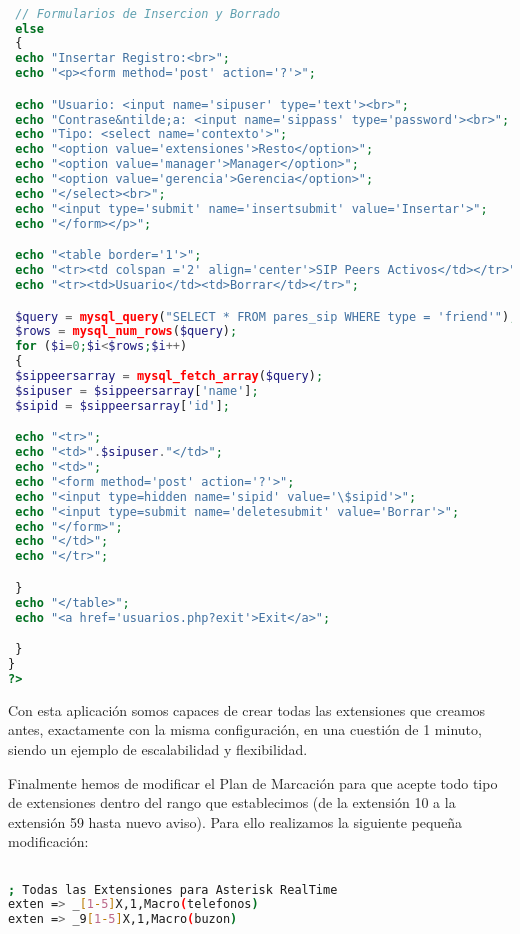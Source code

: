 \begin{lstlisting}[language=php,title={./www/usuarios.php}]

 // Formularios de Insercion y Borrado
 else
 {
 echo "Insertar Registro:<br>";
 echo "<p><form method='post' action='?'>";

 echo "Usuario: <input name='sipuser' type='text'><br>";
 echo "Contrase&ntilde;a: <input name='sippass' type='password'><br>";
 echo "Tipo: <select name='contexto'>";
 echo "<option value='extensiones'>Resto</option>";
 echo "<option value='manager'>Manager</option>";
 echo "<option value='gerencia'>Gerencia</option>";
 echo "</select><br>";
 echo "<input type='submit' name='insertsubmit' value='Insertar'>";
 echo "</form></p>";

 echo "<table border='1'>";
 echo "<tr><td colspan ='2' align='center'>SIP Peers Activos</td></tr>";
 echo "<tr><td>Usuario</td><td>Borrar</td></tr>";

 $query = mysql_query("SELECT * FROM pares_sip WHERE type = 'friend'");
 $rows = mysql_num_rows($query);
 for ($i=0;$i<$rows;$i++)
 {
 $sippeersarray = mysql_fetch_array($query);
 $sipuser = $sippeersarray['name'];
 $sipid = $sippeersarray['id'];

 echo "<tr>";
 echo "<td>".$sipuser."</td>";
 echo "<td>";
 echo "<form method='post' action='?'>";
 echo "<input type=hidden name='sipid' value='\$sipid'>";
 echo "<input type=submit name='deletesubmit' value='Borrar'>";
 echo "</form>";
 echo "</td>";
 echo "</tr>";

 }
 echo "</table>";
 echo "<a href='usuarios.php?exit'>Exit</a>";

 }
}
?>

\end{lstlisting}

Con esta aplicación somos capaces de crear todas las extensiones que creamos antes, exactamente con la misma configuración, en una cuestión de 1 minuto, siendo un ejemplo de escalabilidad y flexibilidad.

Finalmente hemos de modificar el Plan de Marcación para que acepte todo tipo de extensiones dentro del rango que establecimos (de la extensión 10 a la extensión 59 hasta nuevo aviso). Para ello realizamos la siguiente pequeña modificación:

\begin{lstlisting}[language=bash,title={/etc/asterisk/extensions.conf}]

; Todas las Extensiones para Asterisk RealTime
exten => _[1-5]X,1,Macro(telefonos)
exten => _9[1-5]X,1,Macro(buzon)

\end{lstlisting}

